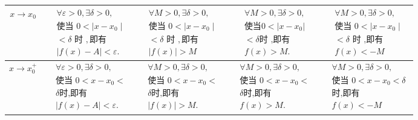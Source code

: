 \documentclass[8pt a4paper, oneside, UTF8]{ctexbook}
\begin{document}
\begin{sloppypar}
\begin{center}
\begin{tabular}{|c|c|c|c|c|}
            $x \to x_0$       & $\begin{aligned}&\forall\varepsilon>0,\exists\delta>0, \\&\text{使当 }0<\mid x-x_0\mid  \\&<\delta\text{ 时 },\text{即有} \\&|f(x)-A|<\varepsilon.\end{aligned}$ & $\begin{aligned}&\forall M>0,\exists\delta>0, \\&\text{使当 }0<\mid x-x_{0}\mid  \\&<\delta\text{ 时 },\text{即有}\\& |f(x)|>M\end{aligned}$ & $\begin{aligned}&\forall M>0,\exists\delta>0, \\&\text{使当} 0<|x-x_0| \\ &<\delta \text{时 ,即有} \\ &f(x)>M.\end{aligned}$      & $\begin{aligned}&\forall M>0,\exists\delta>0, \\&\text{使当 }0<\mid x-x_{0}\mid  \\&<\delta\text{ 时 ,即有}\\& f(x) <-M\end{aligned}$ \\ \hline
            $x \to x_0^+$     & $\begin{aligned}&\forall\varepsilon>0,\exists\delta>0, \\&\text{使当 }0<x-x_{0}< \\&\delta \text{时,即有}\\&|f(x)-A|<\varepsilon.\end{aligned}$                  & $\begin{aligned}&\forall M>0,\exists\delta>0, \\&\text{使当 }0<x-x_{0}< \\&\delta \text{时,即有} \\&|f(x)|>M.\end{aligned}$                  & $\begin{aligned}&\forall M>0,\exists\delta>0, \\&\text{使当 }0<x-x_{0}< \\&\delta \text{时,即有} \\&f(x)>M.\end{aligned}$         & $\begin{aligned}&\forall M>0,\exists\delta>0, \\&\text{使当 }0<x-x_{0}<\delta  \\&\text{时,即有} \\& f(x) <-M\end{aligned} $          \\ \hline

\end{tabular}
\end{center}
\end{sloppypar}
\end{document}
